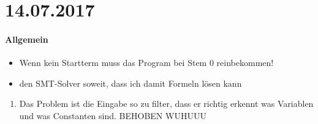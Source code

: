 \section*{14.07.2017}

\paragraph{Allgemein}
\begin{itemize}
	\item Wenn kein Startterm muss das Program bei Stem 0 reinbekommen!
	\item den SMT-Solver soweit, dass ich damit Formeln lösen kann
\end{itemize}

\begin{enumerate}
	\item Das Problem ist die Eingabe so zu filter, dass er richtig erkennt was Variablen und was Constanten sind. \answer BEHOBEN WUHUUU
\end{enumerate}